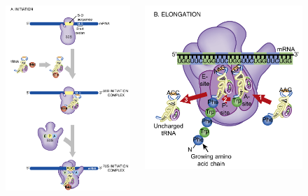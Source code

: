 \documentclass[11pt,ignorenonframetext,aspectratio=169]{beamer}
\begin{document}
\begin{frame}{}
\protect\hypertarget{section-28}{}
\begin{figure}
  \begin{columns}[T,onlytextwidth]
  \begin{center}
  \includegraphics[width=0.80\linewidth]{../images/translation_prokaryotes_init.png}
  \end{center}
  \begin{center}
  \includegraphics[width=0.96\linewidth]{../images/translation_prokaryotes_elongation.png}

\end{center}
\end{columns}
\end{figure}
\end{frame}
\end{document}
